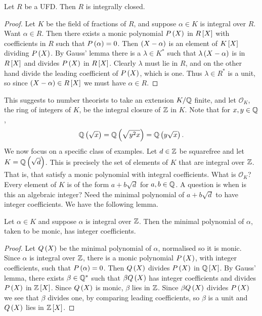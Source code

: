 \begin{theorem}
Let $ R $ be a UFD. Then $ R $ is integrally closed.
\end{theorem}

\begin{proof}
Let $ K $ be the field of fractions of $ R $, and suppose $ \alpha \in K $ is integral over $ R $. Want $ \alpha \in R $. Then there exists a monic polynomial $ P\rb{X} $ in $ R\sb{X} $ with coefficients in $ R $ such that $ P\rb{\alpha} = 0 $. Then $ \rb{X - \alpha} $ is an element of $ K\sb{X} $ dividing $ P\rb{X} $. By Gauss' lemma there is a $ \lambda \in K^* $ such that $ \lambda\rb{X - \alpha} $ is in $ R\sb{X} $ and divides $ P\rb{X} $ in $ R\sb{X} $. Clearly $ \lambda $ must lie in $ R $, and on the other hand divide the leading coefficient of $ P\rb{X} $, which is one. Thus $ \lambda \in R^* $ is a unit, so since $ \rb{X - \alpha} \in R\sb{X} $ we must have $ \alpha \in R $.
\end{proof}

This suggests to number theorists to take an extension $ K / \Q $ finite, and let $ \mathcal{O}_K $, the ring of integers of $ K $, be the integral closure of $ \Z $ in $ K $. Note that for $ x, y \in \Q $,
$$ \Q\rb{\sqrt{x}} = \Q\rb{\sqrt{y^2x}} = \Q\rb{y\sqrt{x}}. $$
We now focus on a specific class of examples. Let $ d \in \Z $ be squarefree and let $ K = \Q\rb{\sqrt{d}} $. This is precisely the set of elements of $ K $ that are integral over $ \Z $. That is, that satisfy a monic polynomial with integral coefficients. What is $ \mathcal{O}_K $? Every element of $ K $ is of the form $ a + b\sqrt{d} $ for $ a, b \in \Q $. A question is when is this an algebraic integer? Need the minimal polynomial of $ a + b\sqrt{d} $ to have integer coefficients. We have the following lemma.

\begin{lemma}
Let $ \alpha \in K $ and suppose $ \alpha $ is integral over $ \Z $. Then the minimal polynomial of $ \alpha $, taken to be monic, has integer coefficients.
\end{lemma}

\begin{proof}
Let $ Q\rb{X} $ be the minimal polynomial of $ \alpha $, normalised so it is monic. Since $ \alpha $ is integral over $ \Z $, there is a monic polynomial $ P\rb{X} $, with integer coefficients, such that $ P\rb{\alpha} = 0 $. Then $ Q\rb{X} $ divides $ P\rb{X} $ in $ \Q\sb{X} $. By Gauss' lemma, there exists $ \beta \in \Q^* $ such that $ \beta Q\rb{X} $ has integer coefficients and divides $ P\rb{X} $ in $ \Z\sb{X} $. Since $ Q\rb{X} $ is monic, $ \beta $ lies in $ \Z $. Since $ \beta Q\rb{X} $ divides $ P\rb{X} $ we see that $ \beta $ divides one, by comparing leading coefficients, so $ \beta $ is a unit and $ Q\rb{X} $ lies in $ \Z\sb{X} $.
\end{proof}

